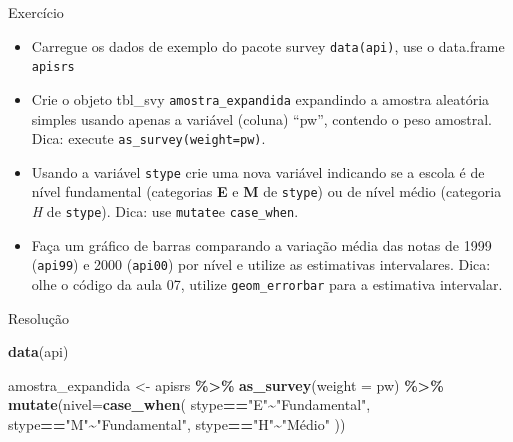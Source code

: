 \documentclass[
  9pt,
  ignorenonframetext,
]{beamer}
\newenvironment{Shaded}{\begin{snugshade}}{\end{snugshade}}
\newcommand{\DataTypeTok}[1]{\textcolor[rgb]{0.13,0.29,0.53}{#1}}
\newcommand{\KeywordTok}[1]{\textcolor[rgb]{0.13,0.29,0.53}{\textbf{#1}}}
\newcommand{\NormalTok}[1]{#1}
\newcommand{\OperatorTok}[1]{\textcolor[rgb]{0.81,0.36,0.00}{\textbf{#1}}}
\newcommand{\StringTok}[1]{\textcolor[rgb]{0.31,0.60,0.02}{#1}}
\begin{document}
\begin{frame}[fragile]{Exercício}
\protect\hypertarget{exercuxedcio}{}
\begin{itemize}
\item
  Carregue os dados de exemplo do pacote survey \texttt{data(api)}, use
  o data.frame \texttt{apisrs}
\item
  Crie o objeto tbl\_svy \texttt{amostra\_expandida} expandindo a
  amostra aleatória simples usando apenas a variável (coluna) ``pw'',
  contendo o peso amostral. Dica: execute
  \texttt{as\_survey(weight=pw)}.
\item
  Usando a variável \texttt{stype} crie uma nova variável indicando se a
  escola é de nível fundamental (categorias \textbf{E} e \textbf{M} de
  \texttt{stype}) ou de nível médio (categoria \emph{H} de
  \texttt{stype}). Dica: use \texttt{mutate}e \texttt{case\_when}.
\item
  Faça um gráfico de barras comparando a variação média das notas de
  1999 (\texttt{api99}) e 2000 (\texttt{api00}) por nível e utilize as
  estimativas intervalares. Dica: olhe o código da aula 07, utilize
  \texttt{geom\_errorbar} para a estimativa intervalar.
\end{itemize}
\end{frame}

\begin{frame}[fragile]{Resolução}
\protect\hypertarget{resoluuxe7uxe3o}{}
\begin{Shaded}
\begin{Highlighting}[]
\KeywordTok{data}\NormalTok{(api)}

\NormalTok{amostra\_expandida \textless{}{-}}\StringTok{ }\NormalTok{apisrs }\OperatorTok{\%\textgreater{}\%}\StringTok{ }
\StringTok{  }\KeywordTok{as\_survey}\NormalTok{(}\DataTypeTok{weight =}\NormalTok{ pw) }\OperatorTok{\%\textgreater{}\%}
\StringTok{  }\KeywordTok{mutate}\NormalTok{(}\DataTypeTok{nivel=}\KeywordTok{case\_when}\NormalTok{(}
\NormalTok{    stype}\OperatorTok{==}\StringTok{"E"}\OperatorTok{\textasciitilde{}}\StringTok{"Fundamental"}\NormalTok{,}
\NormalTok{    stype}\OperatorTok{==}\StringTok{"M"}\OperatorTok{\textasciitilde{}}\StringTok{"Fundamental"}\NormalTok{,}
\NormalTok{    stype}\OperatorTok{==}\StringTok{"H"}\OperatorTok{\textasciitilde{}}\StringTok{"Médio"}
\NormalTok{  ))}
\end{Highlighting}
\end{Shaded}
\end{frame}
\end{document}
